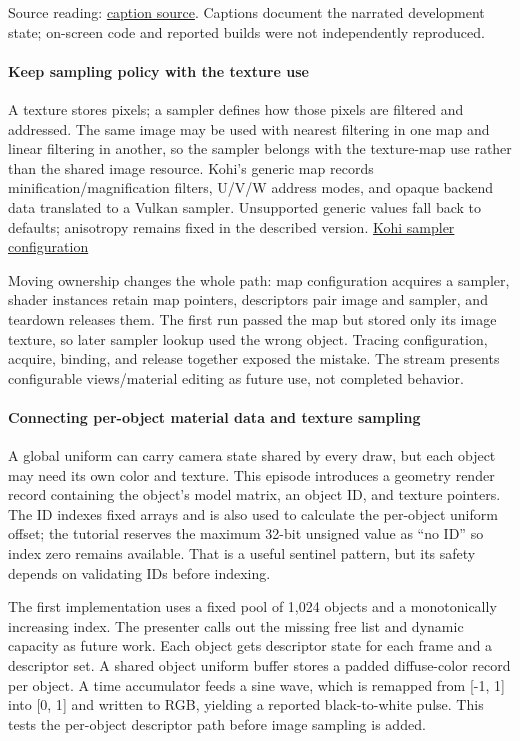 Source reading: \href{https://www.youtube.com/watch?v=01KQiQ4fdXs}{caption source}. Captions document the narrated development state; on-screen code and reported builds were not independently reproduced.

\paragraph{Keep sampling policy with the texture use}\label{keep-sampling-policy-with-the-texture-use}

A texture stores pixels; a sampler defines how those pixels are filtered and addressed. The same image may be used with nearest filtering in one map and linear filtering in another, so the sampler belongs with the texture-map use rather than the shared image resource. Kohi's generic map records minification/magnification filters, U/V/W address modes, and opaque backend data translated to a Vulkan sampler. Unsupported generic values fall back to defaults; anisotropy remains fixed in the described version. \href{https://www.youtube.com/watch?v=hGA2veSznn8}{Kohi sampler configuration}

Moving ownership changes the whole path: map configuration acquires a sampler, shader instances retain map pointers, descriptors pair image and sampler, and teardown releases them. The first run passed the map but stored only its image texture, so later sampler lookup used the wrong object. Tracing configuration, acquire, binding, and release together exposed the mistake. The stream presents configurable views/material editing as future use, not completed behavior.

\paragraph{Connecting per-object material data and texture sampling}\label{connecting-per-object-material-data-and-texture-sampling}

A global uniform can carry camera state shared by every draw, but each object may need its own color and texture. This episode introduces a geometry render record containing the object's model matrix, an object ID, and texture pointers. The ID indexes fixed arrays and is also used to calculate the per-object uniform offset; the tutorial reserves the maximum 32-bit unsigned value as ``no ID'' so index zero remains available. That is a useful sentinel pattern, but its safety depends on validating IDs before indexing.

The first implementation uses a fixed pool of 1,024 objects and a monotonically increasing index. The presenter calls out the missing free list and dynamic capacity as future work. Each object gets descriptor state for each frame and a descriptor set. A shared object uniform buffer stores a padded diffuse-color record per object. A time accumulator feeds a sine wave, which is remapped from {[}-1, 1{]} into {[}0, 1{]} and written to RGB, yielding a reported black-to-white pulse. This tests the per-object descriptor path before image sampling is added.

